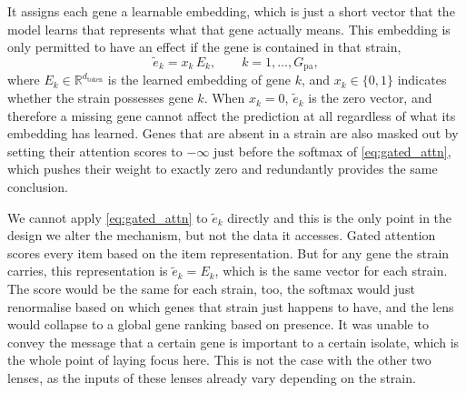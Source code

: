 \documentclass[journal]{IEEEtran}
\begin{document}
It assigns each gene a learnable embedding, which is just a short vector that the
model learns that represents what that gene actually means. This embedding is only
permitted to have an effect if the gene is contained in that strain,
\begin{equation}
\tilde{e}_k = x_k \, E_k, \qquad k = 1, \dots, G_{\mathrm{pa}},
\label{eq:expertB_embed}
\end{equation}
where $E_k \in \mathbb{R}^{d_{\mathrm{token}}}$ is the learned embedding of gene $k$,
and $x_k \in \{0,1\}$ indicates whether the strain possesses gene $k$. When
$x_k = 0$, $\tilde{e}_k$ is the zero vector, and therefore a missing gene cannot
affect the prediction at all regardless of what its embedding has learned. Genes that
are absent in a strain are also masked out by setting their attention scores to
$-\infty$ just before the softmax of \eqref{eq:gated_attn}, which pushes
their weight to exactly zero and redundantly provides the same conclusion.

We cannot apply \eqref{eq:gated_attn} to $\tilde{e}_k$ directly and this is
the only point in the design we alter the mechanism, but not the data it accesses.
Gated attention scores every item based on the item representation. But for any gene
the strain carries, this representation is $\tilde{e}_k = E_k$, which is the same
vector for each strain. The score would be the same for each strain, too, the softmax
would just renormalise based on which genes that strain just happens to have, and the
lens would collapse to a global gene ranking based on presence. It was unable to
convey the message that a certain gene is important to a certain isolate, which is
the whole point of laying focus here. This is not the case with the other two lenses,
as the inputs of these lenses already vary depending on the strain.
\end{document}

